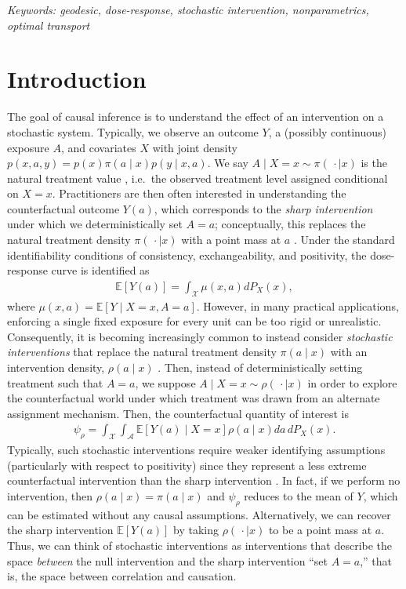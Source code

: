 \documentclass[11pt,twoside]{article}
\theoremstyle{definition}
\theoremstyle{remark}
\begin{document}
\noindent
{\it Keywords: geodesic, dose-response, stochastic intervention, nonparametrics, optimal transport} 

\bigskip 
{}

\section{Introduction}


The goal of causal inference is to understand the effect of an intervention on a stochastic system. Typically, we observe an outcome $Y$, a (possibly continuous) exposure $A$, and covariates $X$ with joint density $p(x,a,y) = p(x) \pi(a \! \mid \! x) p(y \! \mid \! x,a)$. We say $A \mid X = x \sim \pi( \, \cdot \mid x)$ is the natural treatment value \citep{YoungHernanRobins+2014+1+19}, i.e.\ the observed treatment level assigned conditional on $X = x$. Practitioners are then often interested in understanding the counterfactual outcome $Y(a)$, which corresponds to the \textit{sharp intervention} under which we deterministically set $A = a$; conceptually, this replaces the natural treatment density $\pi(\, \cdot \mid x)$ with a point mass at $a$ \citep{rubin1974estimating, ROBINS19861393}. Under the standard identifiability conditions of consistency, exchangeability, and positivity, the dose-response curve is identified as
\begin{align*}
    \mathbb{E}[Y(a)] = \int_{\mathcal{X}}\mu(x,a)dP_X(x),
\end{align*}
where $\mu(x, a) = \mathbb{E}[Y \mid X = x, A = a]$. However, in many practical applications, enforcing a single fixed exposure for every unit can be too rigid or unrealistic. Consequently, it is becoming increasingly common to instead consider \textit{stochastic interventions} that replace the natural treatment density $\pi(a \! \mid \! x)$ with an intervention density, $\rho(a \! \mid \! x)$ \citep{hubbard2008, diaz2012}. Then, instead of deterministically setting treatment such that $A = a$, we suppose $A \mid X = x \sim \rho( \, \cdot \mid x)$ in order to explore the counterfactual world under which treatment was drawn from an alternate assignment mechanism.  Then, the counterfactual quantity of interest is
\begin{align} \label{stochastic_expectation}
   \psi_\rho  = \int_{\mathcal{X}} \int_{\mathcal{A}}  \mathbb{E}[Y(a) \mid X = x] \rho(a \! \mid \! x)da \, d P_X(x).
\end{align}
Typically, such stochastic interventions require weaker identifying assumptions (particularly with respect to positivity) since they represent a less extreme counterfactual intervention than the sharp intervention \citep{kennedy2019nonparametric}. In fact, if we perform no intervention, then $\rho(a \! \mid \! x) = \pi(a \! \mid \! x)$ and $\psi_\rho$ reduces to the mean of $Y$, which can be estimated without any causal assumptions. Alternatively, we can recover the sharp intervention $\mathbb{E}[Y(a)]$ by taking $\rho( \, \cdot \mid x)$ to be a point mass at $a$. Thus, we can think of stochastic interventions as interventions that describe the space \textit{between} the null intervention and the sharp intervention ``set $A=a$,'' that is, the space between correlation and causation. 
\end{document}
